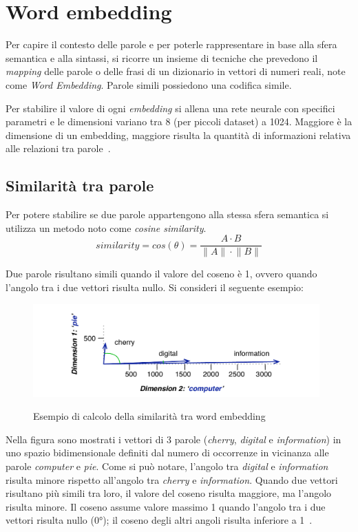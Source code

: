 \section{Word embedding}
\label{sec:word embedding}
Per capire il contesto delle parole e per poterle rappresentare in base alla sfera semantica e alla sintassi, si ricorre un insieme di tecniche che prevedono il \textit{mapping} delle parole o delle frasi di un dizionario in vettori di numeri reali, note come \emph{Word Embedding}.
Parole simili possiedono una codifica simile.


Per stabilire il valore di ogni \textit{embedding} si allena una rete neurale con specifici parametri e le dimensioni variano tra 8 (per piccoli dataset) a 1024. Maggiore è la dimensione di un embedding, maggiore risulta la quantità di informazioni relativa alle relazioni tra parole~\cite{tensword}.

\subsection{Similarità tra parole}
\label{Similarita tra parole}
Per potere stabilire se due parole appartengono alla stessa sfera semantica si utilizza un metodo noto come \emph{cosine similarity}.
\begin{equation}
    similarity = cos(\theta) = \frac{A\cdot{B}}{\|A\|\cdot{\|B\|}}
\end{equation}

Due parole risultano simili quando il valore del coseno è 1, ovvero quando l'angolo tra i due vettori risulta nullo. Si consideri il seguente esempio:

\begin{figure}[h]
    \centering
    \includegraphics[width=11cm]{./immagini/cosine_similarity_esempio.png}
    \label{cosine}
    \caption{Esempio di calcolo della similarità tra word embedding~\cite{cosine}}
\end{figure}

Nella figura sono mostrati i vettori di 3 parole (\textit{cherry}, \textit{digital} e \textit{information}) in uno spazio bidimensionale definiti dal numero di occorrenze in vicinanza alle parole \textit{computer} e \textit{pie}.
Come si può notare, l'angolo tra \textit{digital} e \textit{information} risulta minore rispetto all'angolo tra \textit{cherry} e \textit{information}.
Quando due vettori risultano più simili tra loro, il valore del coseno risulta maggiore, ma l'angolo risulta minore. Il coseno assume valore massimo 1 quando l'angolo tra i due vettori risulta nullo (0°); il coseno degli altri angoli risulta inferiore a 1~\cite{cosine}.

